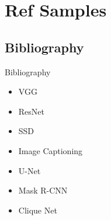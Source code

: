 \section{Ref Samples}

\subsection{Bibliography}
\begin{frame}{Bibliography}
  \begin{itemize}
    \item VGG \cite{bib:simonyan2014very}
    \item ResNet \cite{bib:he2016deep}
    \item SSD \cite{bib:liu2016ssd}
    \item Image Captioning \cite{bib:xu2015show}
    \item U-Net \cite{bib:ronneberger2015u}
    \item Mask R-CNN \cite{bib:he2017mask}
    \item Clique Net \cite{bib:yang2018convolutional}
  \end{itemize}
\end{frame}

